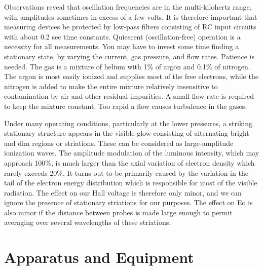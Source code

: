 \documentclass{../lab}
\begin{document}
Observations reveal that oscillation frequencies are in the multi-kilohertz range, with amplitudes sometimes in excess of a few volts. It is therefore important that measuring devices be protected by low-pass filters consisting of RC input circuits with about 0.2 sec time constants. Quiescent (oscillation-free) operation is a necessity for all measurements. You may have to invest some time finding a stationary state, by varying the current, gas pressure, and flow rates. Patience is needed. The gas is a mixture of helium with 1\% of argon and 0.1\% of nitrogen. The argon is most easily ionized and supplies most of the free electrons, while the nitrogen is added to make the entire mixture relatively insensitive to contamination by air and other residual impurities. A small flow rate is required to keep the mixture constant. Too rapid a flow causes turbulence in the gases.

Under many operating conditions, particularly at the lower pressures, a striking stationary structure appears in the visible glow consisting of alternating bright and dim regions or striations. These can be considered as large-amplitude ionization waves. The amplitude modulation of the luminous intensity, which may approach 100\%, is much larger than the axial variation of electron density which rarely exceeds 20\%. It turns out to be primarily caused by the variation in the tail of the electron energy distribution which is responsible for most of the visible radiation. The effect on our Hall voltage is therefore only minor, and we can ignore the presence of stationary striations for our purposes. The effect on Eo is also minor if the distance between probes is made large enough to permit averaging over several wavelengths of these striations.

\section{Apparatus and Equipment}
\end{document}
